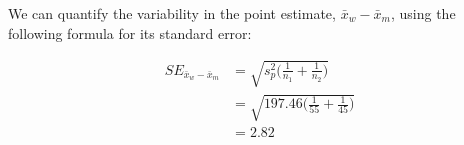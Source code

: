 We can quantify the variability in the point estimate, $\bar{x}_{w} - \bar{x}_{m}$, using the following formula for its standard error:

\begin{align*}
SE_{\bar{x}_{w} - \bar{x}_{m}}
&=	\sqrt{ s_{p}^{2} \bigg( \frac{1}{n_{1}} + \frac{1}{n_{2}} \bigg)}	\\
&=	\sqrt{197.46 \bigg( \frac{1}{55} + \frac{1}{45} \bigg)}			\\
&=	2.82
\end{align*}






